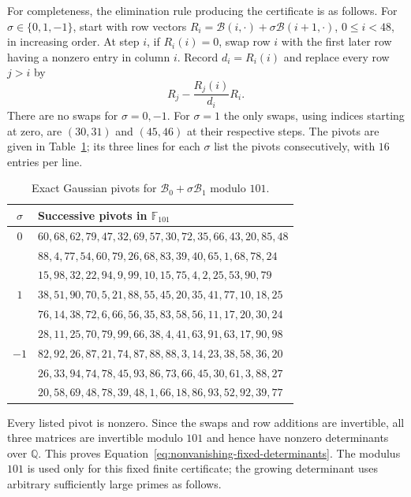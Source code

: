 For completeness, the elimination rule producing the certificate is as
follows. For $\sigma\in\{0,1,-1\}$, start with row vectors
$R_i=\mathcal B(i,{\cdot})+\sigma\mathcal B(i+1,{\cdot})$,
$0\le i<48$, in increasing order. At step $i$, if $R_i(i)=0$, swap
row $i$ with the first later row having a nonzero entry in column $i$.
Record $d_i=R_i(i)$ and replace every row $j>i$ by
\[
 R_j-\frac{R_j(i)}{d_i}R_i.
\]
There are no swaps for $\sigma=0,-1$. For $\sigma=1$ the only swaps,
using indices starting at zero, are $(30,31)$ and $(45,46)$ at their
respective steps. The pivots are given in
Table~\ref{tab:modular-pivots}; its three lines for each $\sigma$
list the pivots consecutively, with $16$ entries per line.

\begin{table}[htbp]
\centering
\small
\begin{tabular}{cl}
\toprule
$\sigma$ & Successive pivots in $\mathbb F_{101}$\\
\midrule
$0$ & $60,68,62,79,47,32,69,57,30,72,35,66,43,20,85,48$\\
& $88,4,77,54,60,79,26,68,83,39,40,65,1,68,78,24$\\
& $15,98,32,22,94,9,99,10,15,75,4,2,25,53,90,79$\\[2pt]
$1$ & $38,51,90,70,5,21,88,55,45,20,35,41,77,10,18,25$\\
& $76,14,38,72,6,66,56,35,83,58,56,11,17,20,30,24$\\
& $28,11,25,70,79,99,66,38,4,41,63,91,63,17,90,98$\\[2pt]
$-1$ & $82,92,26,87,21,74,87,88,88,3,14,23,38,58,36,20$\\
& $26,33,94,74,78,45,93,86,73,66,45,30,61,3,88,27$\\
& $20,58,69,48,78,39,48,1,66,18,86,93,52,92,39,77$\\
\bottomrule
\end{tabular}
\caption{Exact Gaussian pivots for $\mathcal B_0+\sigma\mathcal B_1$
modulo $101$.}\label{tab:modular-pivots}
\end{table}

Every listed pivot is nonzero. Since the swaps and row additions are
invertible, all three matrices are invertible modulo $101$ and hence
have nonzero determinants over $\mathbb Q$. This proves
Equation~\eqref{eq:nonvanishing-fixed-determinants}. The modulus $101$
is used only for this fixed finite certificate; the growing determinant
uses arbitrary sufficiently large primes as follows.

